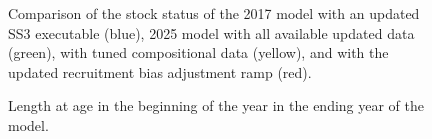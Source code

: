 \documentclass[
]{scrartcl}
\begin{document}
\begin{figure}


\caption{\label{fig-newdata_6}Comparison of the stock status of the 2017
model with an updated SS3 executable (blue), 2025 model with all
available updated data (green), with tuned compositional data (yellow),
and with the updated recruitment bias adjustment ramp (red).}

\end{figure}%

\begin{figure}


\caption{\label{fig-growth}Length at age in the beginning of the year in
the ending year of the model.}

\end{figure}%
\end{document}
